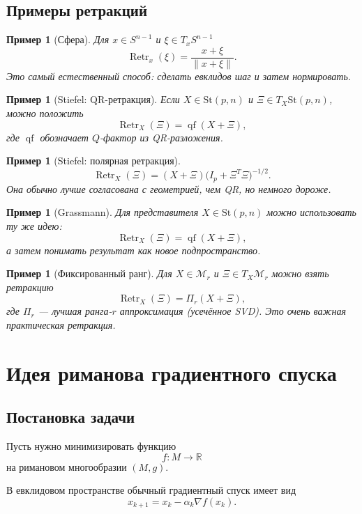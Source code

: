 \documentclass[12pt,a4paper]{article}
\theoremstyle{rudef}
\newtheorem{example}[definition]{Пример}
\theoremstyle{ruplain}
\newcommand{\R}{\mathbb{R}}
\newcommand{\St}{\mathrm{St}}
\newcommand{\Retr}{\operatorname{Retr}}
\newcommand{\norm}[1]{\left\lVert #1\right\rVert}
\begin{document}
\subsection{Примеры ретракций}

\begin{example}[Сфера]
Для $x\in S^{n-1}$ и $\xi\in T_xS^{n-1}$
\[
\Retr_x(\xi)=\frac{x+\xi}{\norm{x+\xi}}.
\]
Это самый естественный способ: сделать евклидов шаг и затем нормировать.
\end{example}

\begin{example}[Stiefel: QR-ретракция]
Если $X\in \St(p,n)$ и $\Xi\in T_X\St(p,n)$, можно положить
\[
\Retr_X(\Xi)=\operatorname{qf}(X+\Xi),
\]
где $\operatorname{qf}$ обозначает $Q$-фактор из QR-разложения.
\end{example}

\begin{example}[Stiefel: полярная ретракция]
\[
\Retr_X(\Xi)=(X+\Xi)\bigl(I_p+\Xi^T\Xi\bigr)^{-1/2}.
\]
Она обычно лучше согласована с геометрией, чем QR, но немного дороже.
\end{example}

\begin{example}[Grassmann]
Для представителя $X\in \St(p,n)$ можно использовать ту же идею:
\[
\Retr_X(\Xi)=\operatorname{qf}(X+\Xi),
\]
а затем понимать результат как новое подпространство.
\end{example}

\begin{example}[Фиксированный ранг]
Для $X\in \mathcal M_r$ и $\Xi\in T_X\mathcal M_r$ можно взять ретракцию
\[
\Retr_X(\Xi)=\Pi_r(X+\Xi),
\]
где $\Pi_r$ --- лучшая ранга-$r$ аппроксимация (усечённое SVD). Это очень важная практическая ретракция.
\end{example}

\section{Идея риманова градиентного спуска}

\subsection{Постановка задачи}

Пусть нужно минимизировать функцию
\[
f:M\to \R
\]
на римановом многообразии $(M,g)$.

В евклидовом пространстве обычный градиентный спуск имеет вид
\[
x_{k+1}=x_k-\alpha_k\nabla f(x_k).
\]
\end{document}
